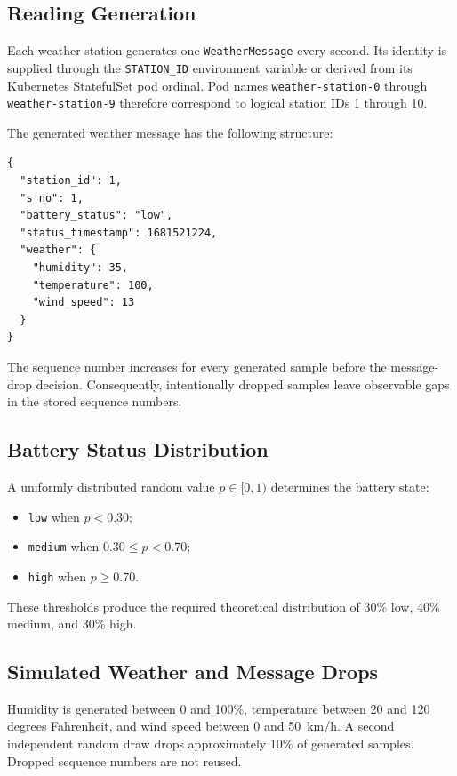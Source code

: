 \documentclass[12pt,a4paper]{article}
\begin{document}
\subsection{Reading Generation}
Each weather station generates one \texttt{WeatherMessage} every second. Its identity is supplied through the \texttt{STATION\_ID} environment variable or derived from its Kubernetes StatefulSet pod ordinal. Pod names \texttt{weather-station-0} through \texttt{weather-station-9} therefore correspond to logical station IDs 1 through 10.

The generated weather message has the following structure:

\begin{lstlisting}[language={},caption={Weather status JSON schema.}]
{
  "station_id": 1,
  "s_no": 1,
  "battery_status": "low",
  "status_timestamp": 1681521224,
  "weather": {
    "humidity": 35,
    "temperature": 100,
    "wind_speed": 13
  }
}
\end{lstlisting}

The sequence number increases for every generated sample before the message-drop decision. Consequently, intentionally dropped samples leave observable gaps in the stored sequence numbers.

\subsection{Battery Status Distribution}
A uniformly distributed random value $p \in [0,1)$ determines the battery state:

\begin{itemize}
    \item \texttt{low} when $p < 0.30$;
    \item \texttt{medium} when $0.30 \leq p < 0.70$;
    \item \texttt{high} when $p \geq 0.70$.
\end{itemize}

These thresholds produce the required theoretical distribution of 30\% low, 40\% medium, and 30\% high.

\subsection{Simulated Weather and Message Drops}
Humidity is generated between 0 and 100\%, temperature between 20 and 120 degrees Fahrenheit, and wind speed between 0 and 50~km/h. A second independent random draw drops approximately 10\% of generated samples. Dropped sequence numbers are not reused.
\end{document}
